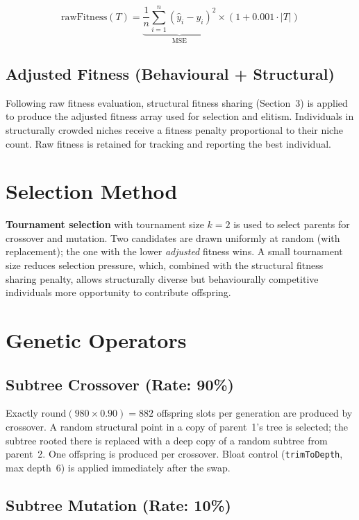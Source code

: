 \documentclass[12pt,a4paper]{article}
\begin{document}
\[
\text{rawFitness}(T) = \underbrace{\frac{1}{n}\sum_{i=1}^n (\hat{y}_i - y_i)^2}_{\text{MSE}} \times (1 + 0.001 \cdot |T|)
\]

\subsection{Adjusted Fitness (Behavioural + Structural)}

Following raw fitness evaluation, structural fitness sharing (Section~3) is applied
to produce the adjusted fitness array used for selection and elitism. Individuals
in structurally crowded niches receive a fitness penalty proportional to their niche
count. Raw fitness is retained for tracking and reporting the best individual.

\section{Selection Method}

\textbf{Tournament selection} with tournament size $k = 2$ is used to select
parents for crossover and mutation. Two candidates are drawn uniformly at random
(with replacement); the one with the lower \emph{adjusted} fitness wins. A small
tournament size reduces selection pressure, which, combined with the structural
fitness sharing penalty, allows structurally diverse but behaviourally competitive
individuals more opportunity to contribute offspring.

\section{Genetic Operators}

\subsection{Subtree Crossover (Rate: 90\%)}

Exactly $\text{round}(980 \times 0.90) = 882$ offspring slots per generation are
produced by crossover. A random structural point in a copy of parent~1's tree is
selected; the subtree rooted there is replaced with a deep copy of a random subtree
from parent~2. One offspring is produced per crossover. Bloat control
(\texttt{trimToDepth}, max depth~6) is applied immediately after the swap.

\subsection{Subtree Mutation (Rate: 10\%)}
\end{document}
